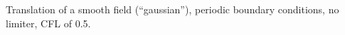Translation of a smooth field (``gaussian''), periodic boundary conditions, no limiter, CFL of 0.5.
